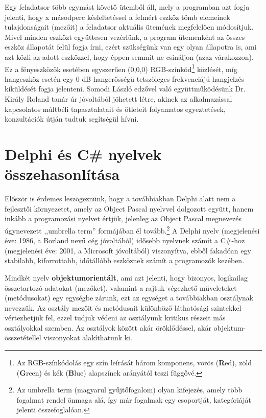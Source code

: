 \documentclass[tocnopagenum]{thesis-ekf}
\begin{document}
	Egy feladatsor több egymást követő ütemből áll, mely a programban azt fogja jelenti, hogy x másodperc késleltetéssel a felmért eszköz tömb elemeinek tulajdonságait (mezőit) a feladatsor aktuális ütemének megfelelően módosítjuk. Mivel minden eszközt együttesen vezérlünk, a program ütemenként az összes eszköz állapotát felül fogja írni, ezért szükségünk van egy olyan állapotra is, ami azt közli az adott eszközzel, hogy éppen semmit ne csináljon (azaz várakozzon). Ez a fényeszközök esetében egyszerűen (0,0,0) RGB-színkód\footnote{Az RGB-színkódolás egy szín leírását három komponens, vörös (\textbf{R}ed), zöld (\textbf{G}reen) és kék (\textbf{B}lue) alapszínek arányától teszi függővé.} közlését, míg hangeszköz esetén egy 0 dB hangerősségű tetszőleges frekvenciájú hangjelzés kiküldését fogja jelenteni.
	Somodi László edzővel való együttműködésünk Dr. Király Roland tanár úr jóvoltából jöhetett létre, akinek az alkalmazással kapcsolatos múltbéli tapasztalatait és  ötleteit folyamatos egyeztetések, konzultációk útján tudtuk segítségül hívni.
	\section{Delphi és C\# nyelvek összehasonlítása}
	Először is érdemes leszögeznünk, hogy a továbbiakban Delphi alatt nem a fejlesztői környezetet, amely az Object Pascal nyelvvel dolgozott együtt, hanem inkább a programozási nyelvet értjük, jelenleg az Object Pascal megnevezés úgynevezett ,,umbrella term'' formájában él tovább.\footnote{Az umbrella term (magyarul gyűjtőfogalom) olyan kifejezés, amely több fogalmat rendel önmaga alá, így már fogalmak egy csoportját, kategóriáját jelenti összefoglalóan.} \cite{sof_delphi}
	A Delphi nyelv (megjelenési éve: 1986, a Borland nevű cég jóvoltából) idősebb nyelvnek számít a C\#-hoz (megjelenési éve: 2001, a Microsoft 
	jóvoltából) viszonyítva, ebből fakadóan egy stabilabb, kiforrottabb, időtállóbb eszköznek számít a programozók kezében. 
	
	Mindkét nyelv \textbf{objektumorientált}, ami azt jelenti, hogy bizonyos, logikailag összetartozó adatokat (mezőket), valamint a rajtuk végezhető műveleteket (metódusokat) egy egységbe zárunk, ezt az egységet a továbbiakban osztálynak nevezzük. Az osztály mezőit és metódusait különböző láthatósági szintekkel vértezhetjük fel, ezzel tudjuk védeni az osztályunk kritikus részeit más osztályokkal szemben. Az osztályok között akár öröklődéssel, akár objektum-összetétellel viszonyokat alakíthatunk ki.
	
\end{document}
